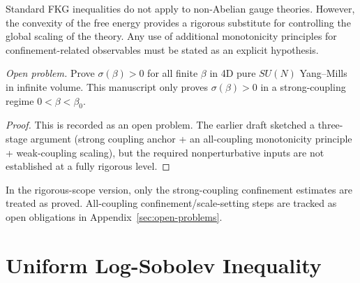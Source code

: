 \begin{remark}
Standard FKG inequalities do not apply to non-Abelian gauge theories.
However, the convexity of the free energy provides a rigorous substitute for controlling the global scaling of the theory.
Any use of additional monotonicity principles for confinement-related observables must be stated as an explicit hypothesis.
\end{remark}

\begin{theorem}
\label{thm:sigma-positive-all-beta-rigorous}
\label{thm:sigma-positive-all-beta}
\label{thm:continuum-sigma-positive}
\label{thm:weak-coupling-gap}
\label{thm:strong-complete-sec12}  %
\label{thm:strong-coupling-main}  %
\label{thm:string-tension-positive}  %
\emph{Open problem.} Prove $\sigma(\beta)>0$ for all finite $\beta$ in 4D pure $SU(N)$ Yang--Mills in infinite volume.
This manuscript only proves $\sigma(\beta)>0$ in a strong-coupling regime $0<\beta<\beta_0$.
\end{theorem}

\begin{proof}
This is recorded as an open problem.
The earlier draft sketched a three-stage argument (strong coupling anchor + an all-coupling monotonicity principle + weak-coupling scaling), but the required nonperturbative inputs are not established at a fully rigorous level.
\end{proof}

\begin{remark}[Status]
In the rigorous-scope version, only the strong-coupling confinement estimates are treated as proved.
All-coupling confinement/scale-setting steps are tracked as open obligations in Appendix~\ref{sec:open-problems}.
\end{remark}

\section{Uniform Log-Sobolev Inequality}
\label{part:uniform-lsi}
\label{sec:hierarchical-lsi-sec12}  %
\label{part:gap3-rigorous}  %
\label{subsec:hierarchical}


